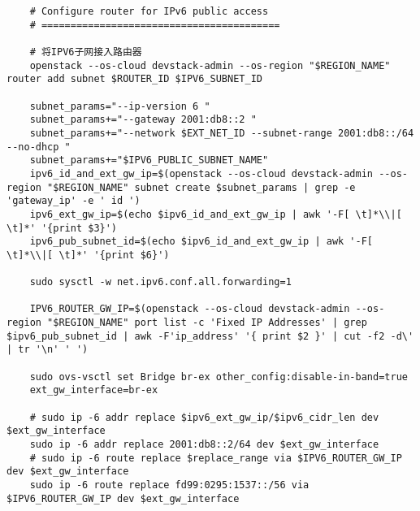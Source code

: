\documentclass[a4paper,left=1.5cm,right=1.5cm,11pt]{article}
\begin{document}
\begin{lstlisting}
	# Configure router for IPv6 public access
	# =========================================

	# 将IPV6子网接入路由器	
	openstack --os-cloud devstack-admin --os-region "$REGION_NAME" router add subnet $ROUTER_ID $IPV6_SUBNET_ID
	
	subnet_params="--ip-version 6 "
    subnet_params+="--gateway 2001:db8::2 "
    subnet_params+="--network $EXT_NET_ID --subnet-range 2001:db8::/64 --no-dhcp "
    subnet_params+="$IPV6_PUBLIC_SUBNET_NAME"
	ipv6_id_and_ext_gw_ip=$(openstack --os-cloud devstack-admin --os-region "$REGION_NAME" subnet create $subnet_params | grep -e 'gateway_ip' -e ' id ')
	ipv6_ext_gw_ip=$(echo $ipv6_id_and_ext_gw_ip | awk '-F[ \t]*\\|[ \t]*' '{print $3}')
    ipv6_pub_subnet_id=$(echo $ipv6_id_and_ext_gw_ip | awk '-F[ \t]*\\|[ \t]*' '{print $6}')

	sudo sysctl -w net.ipv6.conf.all.forwarding=1

	IPV6_ROUTER_GW_IP=$(openstack --os-cloud devstack-admin --os-region "$REGION_NAME" port list -c 'Fixed IP Addresses' | grep $ipv6_pub_subnet_id | awk -F'ip_address' '{ print $2 }' | cut -f2 -d\' | tr '\n' ' ')

	sudo ovs-vsctl set Bridge br-ex other_config:disable-in-band=true
	ext_gw_interface=br-ex

	# sudo ip -6 addr replace $ipv6_ext_gw_ip/$ipv6_cidr_len dev $ext_gw_interface
	sudo ip -6 addr replace 2001:db8::2/64 dev $ext_gw_interface
	# sudo ip -6 route replace $replace_range via $IPV6_ROUTER_GW_IP dev $ext_gw_interface
	sudo ip -6 route replace fd99:0295:1537::/56 via $IPV6_ROUTER_GW_IP dev $ext_gw_interface
	\end{lstlisting}
\end{document}
